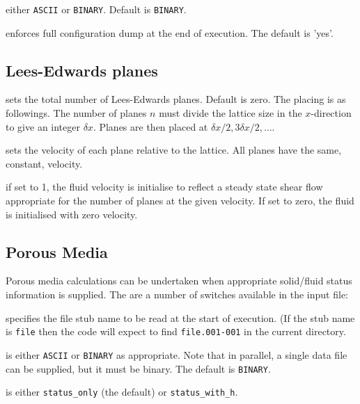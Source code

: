 either \texttt{ASCII} or \texttt{BINARY}. Default is \texttt{BINARY}.


enforces full configuration dump at the end of execution. The
default is 'yes'.



\subsection{Lees-Edwards planes}


sets the total number of Lees-Edwards planes. Default is zero.
The placing is as followings. The number of planes $n$ must
divide the lattice size in the $x$-direction to give an integer
$\delta x$. Planes are then placed at $\delta x / 2, 3\delta x/2, \ldots$.


sets the velocity of each plane relative to the lattice. All planes
have the same, constant, velocity.


if set to 1, the fluid velocity is initialise to reflect a steady
state shear flow appropriate for the number of planes at the
given velocity. If set to zero, the fluid is initialised with
zero velocity.


\subsection{Porous Media}

Porous media calculations can be undertaken when appropriate
solid/fluid status information is supplied. The are a number
of switches available in the input file:


specifies the file stub name to be read at the start of execution.
(If the stub name is \texttt{file} then the code will expect to
find \texttt{file.001-001} in the current directory.


is either \texttt{ASCII} or \texttt{BINARY} as appropriate. Note that
in parallel, a single data file can be supplied, but it must be binary.
The default is \texttt{BINARY}.


is either \texttt{status\_only} (the default) or \texttt{status\_with\_h}.

